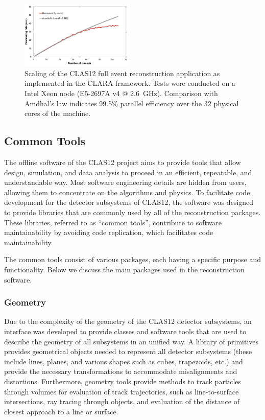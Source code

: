 \begin{figure}
\centering
\includegraphics[width=0.48\textwidth]{pics/scaling.png}
\caption{Scaling of the CLAS12 full event reconstruction application as implemented in the CLARA framework. Tests
  were conducted on a Intel Xeon node (E5-2697A v4 @ 2.6~GHz). Comparison with Amdhal's law indicates 99.5\%
  parallel efficiency over the 32 physical cores of the machine.}
\label{fig:scaling}
\end{figure}

\subsection{Common Tools}
\label{common-tools}

The offline software of the CLAS12 project aims to provide tools that allow design, simulation, and data analysis
to proceed in an efficient, repeatable, and understandable way. Most  software engineering details are hidden from
users, allowing them to concentrate on the algorithms and physics. To facilitate code development for the detector
subsystems of CLAS12, the software was designed to provide libraries that are commonly used by all of the
reconstruction packages.  These libraries, referred to as ``common tools'',  contribute to software maintainability by avoiding code replication, which facilitates code maintainability.

The common tools consist of various packages, each having a specific purpose and functionality. Below we discuss
the main packages used in the reconstruction software.

\subsubsection{Geometry}

Due to the complexity of the geometry of the CLAS12 detector subsystems, an interface was developed to provide
classes and software tools that are used to describe the geometry of all subsystems in an unified way.  A library of
primitives provides geometrical objects needed to represent all detector subsystems (these include lines, planes,
and various shapes such as cubes, trapezoids, etc.) and provide the necessary transformations to accommodate
misalignments and distortions.  Furthermore, geometry tools provide methods to track particles through volumes for
evaluation of track trajectories, such as line-to-surface intersections, ray tracing through objects, and evaluation of
the distance of closest approach to a line or surface.

